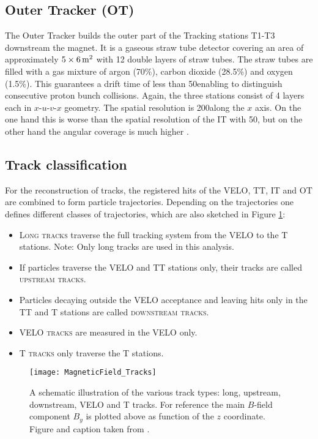 \subsection{Outer Tracker (OT)}
The Outer Tracker builds the outer part of the Tracking stations T1-T3 downstream the magnet.
It is a gaseous straw tube detector covering an area of approximately $5 \times 6 {\rm \,m}^2$ with 12 double layers of straw tubes.
The straw tubes are filled with a gas mixture of argon (70\%), carbon dioxide (28.5\%) and oxygen (1.5\%).
This guarantees a drift time of less than 50\ns enabling to distinguish consecutive proton bunch collisions.
Again, the three stations consist of 4 layers each in $x$-$u$-$v$-$x$ geometry.
The spatial resolution is 200\mum along the $x$ axis.
On the one hand this is worse than the spatial resolution of the IT with 50\mum, but on the other hand the angular coverage is much higher \cite{OT_Performance}.

\subsection{Track classification}
For the reconstruction of tracks, the registered hits of the VELO, TT, IT and OT are combined to form particle trajectories.
Depending on the trajectories one defines different classes of trajectories, which are also sketched in Figure \ref{fig:MagneticField_Tracks}:
\begin{itemize}
    \item \textsc{Long tracks} traverse the full tracking system from the VELO to the T stations.
          Note: Only long tracks are used in this analysis.
    \item If particles traverse the VELO and TT stations only, their tracks are called \textsc{upstream tracks}.
    \item Particles decaying outside the VELO acceptance and leaving hits only in the TT and T stations are called \textsc{downstream tracks}.
    \item \textsc{VELO tracks} are measured in the VELO only.
    \item \textsc{T tracks} only traverse the T stations.
\end{itemize}
\begin{figure}[tb]
    \centering
	\texttt{[image: MagneticField\_Tracks]}	
	\caption{A schematic illustration of the various track types: long, upstream, downstream, VELO and T tracks.
             For reference the main $B$-field component $B_y$ is plotted above as function of the $z$ coordinate.
             Figure and caption taken from \cite{LHCb_Reoptimization}.}
	\label{fig:MagneticField_Tracks}
\end{figure}

